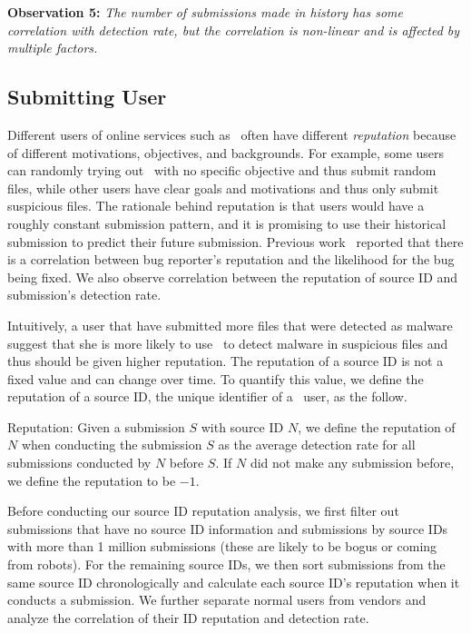 {\bf Observation 5:} 
{\em The number of submissions made in history has some correlation with detection rate, 
but the correlation is non-linear and is affected by multiple factors.}

\subsection{Submitting User}
\label{sec:reputation}


Different users of online services such as \vt\ often have different {\em reputation} 
because of different motivations, objectives, and backgrounds.
For example, some users can randomly trying out \vt\ with no specific objective and thus submit random files,
while other users have clear goals and motivations and thus only submit suspicious files.
The rationale behind reputation is that \vt{} users would have a roughly constant submission pattern, 
and it is promising to use their historical submission to predict their future submission.
Previous work~\cite{GuoICSE2010} reported that there is a correlation between bug reporter's reputation and the likelihood for the bug being fixed. 
We also observe correlation between the reputation of source ID and submission's detection rate. 

Intuitively, a user that have submitted more files that were detected as malware suggest 
that she is more likely to use \vt\ to detect malware in suspicious files 
and thus should be given higher reputation.
The reputation of a source ID is not a fixed value and can change over time. 
To quantify this value, we define the reputation of a source ID, the unique identifier of a \vt\ user, as the follow.


Reputation: Given a submission $S$ with source ID $N$, 
we define the reputation of $N$ when conducting the submission $S$ as the average detection rate for all submissions conducted by $N$ before $S$. 
If $N$ did not make any submission before, we define the reputation to be $-1$. 

Before conducting our source ID reputation analysis, we first filter out submissions
that have no source ID information and submissions by source IDs with more than 1 million submissions (these are likely to be bogus or coming from robots).
For the remaining source IDs, we then sort submissions from the same source ID chronologically 
and calculate each source ID's reputation when it conducts a submission. 
We further separate normal users from vendors and analyze the correlation of their ID reputation and detection rate.

